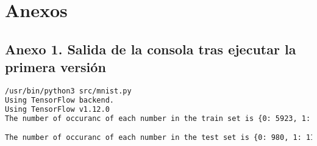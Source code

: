 \chapter{Anexos}
\label{chap:anexos}

\section{Anexo 1. Salida de la consola tras ejecutar la primera versión}
\label{sec:v1-output}

\bigskip

\begin{lstlisting}[language=bash]
/usr/bin/python3 src/mnist.py
Using TensorFlow backend.
Using TensorFlow v1.12.0
The number of occuranc of each number in the train set is {0: 5923, 1: 6742, 2: 5958, 3: 6131, 4: 5842, 5: 5421, 6: 5918, 7: 6265, 8: 5851, 9: 5949}

The number of occuranc of each number in the test set is {0: 980, 1: 1135, 2: 1032, 3: 1010, 4: 982, 5: 892, 6: 958, 7: 1028, 8: 974, 9: 1009}


\end{lstlisting}
